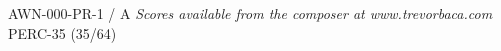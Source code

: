 \documentclass[11pt]{report}
\begin{document}
\null \vfill

AWN-000-PR-1 / A \hfill
\textit{Scores available from the composer at www.trevorbaca.com}
\hfill PERC-35 (35/64)
\end{document}
